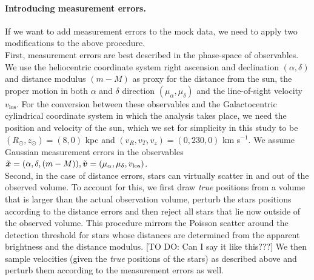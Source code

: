 \paragraph{Introducing measurement errors.} If we want to add measurement errors to the mock data, we need to apply two modifications to the above procedure.
\\First, measurement errors are best described in the phase-space of observables. We use the heliocentric coordinate system right ascension and declination $(\alpha,\delta)$ and distance modulus $(m-M)$ as proxy for the distance from the sun, the proper motion in both $\alpha$ and $\delta$ direction $(\mu_\alpha,\mu_\delta)$ and the line-of-sight velocity $v_\text{los}$. For the conversion between these observables and the Galactocentric cylindrical coordinate system in which the analysis takes place, we need the position and velocity of the sun, which we set for simplicity in this study to be $(R_\odot,z_\odot)=(8,0)$ kpc and $(v_R,v_T,v_z)=(0,230,0)$ km s$^{-1}$. We assume Gaussian measurement errors in the observables $\tilde{\boldsymbol{x}} = (\alpha,\delta,(m-M)), \tilde{\boldsymbol{v}} = (\mu_\alpha,\mu_\delta,v_\text{los})$.
\\Second, in the case of distance errors, stars can virtually scatter in and out of the observed volume. To account for this, we first draw \emph{true} positions from a volume that is larger than the actual observation volume, perturb the stars positions according to the distance errors and then reject all stars that lie now outside of the observed volume. This procedure mirrors the Poisson scatter around the detection threshold for stars whose distances are determined from the apparent brightness and the distance modulus. [TO DO: Can I say it like this???] We then sample velocities (given the \emph{true} positions of the stars) as described above and perturb them according to the measurement errors as well.


